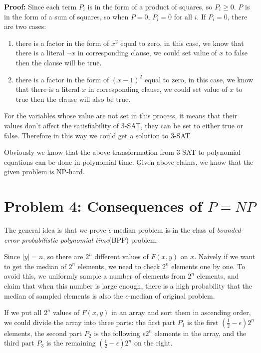 \documentclass[paper=a4, fontsize=11pt]{scrartcl} %
\numberwithin{equation}{section} %
\numberwithin{figure}{section} %
\numberwithin{table}{section} %
\begin{document}
\textbf{Proof:}
Since each term $P_i$ is in the form of a product of squares, so $P_i \geq 0$. $P$ is in the form of
a sum of squares, so when $P=0$, $P_i = 0$ for all $i$. If $P_i = 0$, there are two cases:
\begin{enumerate}
  \item there is a factor in the form of $x^2$ equal to zero, in this case, we know that there is
    a literal $\lnot x$ in corresponding clause, we could set value of $x$ to false then the clause
    will be true.
  \item there is a factor in the form of $(x-1)^2$ equal to zero, in this case, we know that there is
    a literal $x$ in corresponding clause, we could set value of $x$ to true then the clause
    will also be true.
\end{enumerate}
For the variables whose value are not set in this process, it means that their values don't affect
the satisfiability of $3$-SAT, they can be set to either true or false.
Therefore in this way we could get a solution to $3$-SAT.

Obviously we know that the above transformation from $3$-SAT to polynomial equations can be done in
polynomial time. Given above claims, we know that the given problem is NP-hard.


\section*{Problem 4: Consequences of $P = NP$}
The general idea is that we prove $\epsilon$-median problem is in the class of \textit{bounded-error
probabilistic polynomial time}(BPP) problem.

Since $|y| = n$, so there are $2^n$ different values of $F(x, y)$ on $x$. 
Naively if we want to get the median of $2^n$ elements, we need to check $2^n$ elements one by one.
To avoid this, we uniformly sample a number of elements from $2^n$ elements, and claim that when
this number is large enough, there is a high probability that the median of sampled elements is also
the $\epsilon$-median of original problem.

If we put all $2^n$ values of $F(x, y)$ in an array and sort them in ascending order, we could
divide the array into three parts: the first part $P_1$ is the first $(\frac{1}{2}-\epsilon) 2^n$
elements, the second part $P_2$ is the following $\epsilon 2^n$ elements in the array, and the third
part $P_3$ is the remaining $(\frac{1}{2}-\epsilon) 2^n$ on the right.
\end{document}
